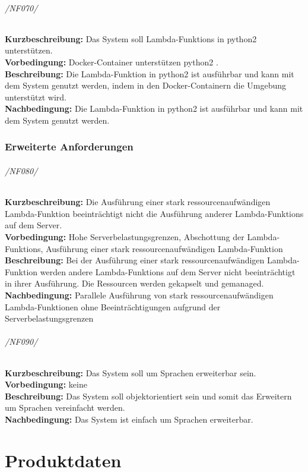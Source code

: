 \documentclass[a4paper,20pt,oneside]{book}
\begin{document}
\subparagraph{/NF070/}
\textbf{Kurzbeschreibung:}  Das System soll \glspl{Lambda-Funktion} in \gls{python2} unterstützen.
\\
\textbf{Vorbedingung:} Docker-Container unterstützen python2 .
\\
\textbf{Beschreibung:} Die \gls{Lambda-Funktion} in \gls{python2} ist ausführbar und kann mit dem System genutzt werden, indem in den Docker-Containern die Umgebung unterstützt wird.
\\
\textbf{Nachbedingung:} Die \gls{Lambda-Funktion} in \gls{python2} ist ausführbar und kann mit dem System genutzt werden.
\pagebreak

\subsection{Erweiterte Anforderungen}

\subparagraph{/NF080/}
\textbf{Kurzbeschreibung:} Die Ausführung einer stark ressourcenaufwändigen \Gls{Lambda-Funktion} beeinträchtigt nicht die Ausführung anderer \Glspl{Lambda-Funktion} auf dem \Gls{Server}.
\\
\textbf{Vorbedingung:} Hohe Serverbelastungsgrenzen, Abschottung der \glspl{Lambda-Funktion}, Ausführung einer stark ressourcenaufwändigen \Gls{Lambda-Funktion}
\\
\textbf{Beschreibung:} Bei der Ausführung einer stark ressourcenaufwändigen \Gls{Lambda-Funktion} werden andere \Glspl{Lambda-Funktion} auf dem \Gls{Server} nicht beeinträchtigt in ihrer Ausführung. Die Ressourcen werden gekapselt und gemanaged.
\\
\textbf{Nachbedingung:} Parallele Ausführung von stark ressourcenaufwändigen \Gls{Lambda-Funktion}en ohne Beeinträchtigungen aufgrund der Serverbelastungsgrenzen

\subparagraph{/NF090/}
\textbf{Kurzbeschreibung:}  Das System soll um Sprachen erweiterbar sein.
\\
\textbf{Vorbedingung:} keine
\\
\textbf{Beschreibung:} Das System soll objektorientiert sein und somit das Erweitern um Sprachen vereinfacht werden.
\\
\textbf{Nachbedingung:} Das System ist einfach um Sprachen erweiterbar.

\chapter{Produktdaten}
\end{document}
